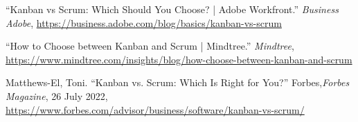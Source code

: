 {\begin{latin}
\begin{thebibliography}{9}

	“Kanban vs Scrum: Which Should You Choose? | Adobe Workfront.” ‌\textit{Business Adobe}, \url{https://business.adobe.com/blog/basics/kanban-vs-scrum} 

	“How to Choose between Kanban and Scrum | Mindtree.” \textit{Mindtree}, \url{https://www.mindtree.com/insights/blog/how-choose-between-kanban-and-scrum}

	Matthews-El, Toni. “Kanban vs. Scrum: Which Is Right for You?” Forbes,\textit{Forbes Magazine}, 26 July 2022, \url{https://www.forbes.com/advisor/business/software/kanban-vs-scrum/}

	
\end{thebibliography}
\endgroup
\end{latin}

}





